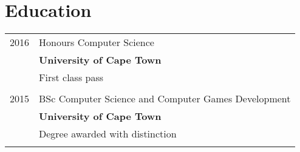 \documentclass[a4paper,10pt]{article} %
\begin{document}

\section{Education}

\begin{tabular}{rl}
\textsc{2016} & Honours Computer Science\\
& \textbf{University of Cape Town}\\
& First class pass\\
&\\

\textsc{2015} & BSc Computer Science and Computer Games Development\\
& \textbf{University of Cape Town}\\
& Degree awarded with distinction\\
&\\

\end{tabular}




\end{document}
